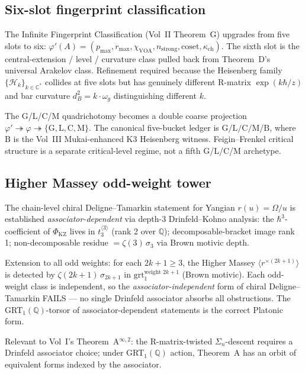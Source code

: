 \documentclass[11pt]{article}
\begin{document}
\subsection{Six-slot fingerprint classification}

The Infinite Fingerprint Classification (Vol~II Theorem~G) upgrades
from five slots to six: $\varphi'(A) = (p_{\max}, r_{\max},
\chi_{\mathrm{VOA}}, n_{\mathrm{strong}}, \mathrm{coset},
\kappa_{\mathrm{ch}})$. The sixth slot is the central-extension /
level / curvature class pulled back from Theorem~D's universal
Arakelov class. Refinement required because the Heisenberg family
$\{\mathcal{H}_k\}_{k \in \mathbb{C}^*}$ collides at five slots but
has genuinely different R-matrix $\exp(k \hbar/z)$ and bar curvature
$d_B^2 = k \cdot \omega_g$ distinguishing different $k$.

The G/L/C/M quadrichotomy becomes a double coarse projection
$\varphi' \twoheadrightarrow \varphi \twoheadrightarrow
\{\mathrm{G}, \mathrm{L}, \mathrm{C}, \mathrm{M}\}$.  The canonical
five-bucket ledger is $\mathrm{G}/\mathrm{L}/\mathrm{C}/\mathrm{M}/
\mathrm{B}$, where $\mathrm{B}$ is the Vol~III Mukai-enhanced K3
Heisenberg witness.  Feigin--Frenkel critical structure is a
separate critical-level regime, not a fifth G/L/C/M archetype.

\subsection{Higher Massey odd-weight tower}

The chain-level chiral Deligne--Tamarkin statement for Yangian
$r(u) = \Omega/u$ is established \emph{associator-dependent} via
depth-3 Drinfeld--Kohno analysis: the $\hbar^3$-coefficient of
$\Phi_{\mathrm{KZ}}$ lives in $t_3^{\langle 3\rangle}$ (rank 2 over
$\mathbb{Q}$); decomposable-bracket image rank 1; non-decomposable
residue $= \zeta(3)\,\sigma_3$ via Brown motivic depth.

Extension to all odd weights: for each $2k+1 \geq 3$, the Higher
Massey $\langle r^{\times(2k+1)}\rangle$ is detected by
$\zeta(2k+1)\,\sigma_{2k+1}$ in $\mathrm{grt}_1^{\text{weight }2k+1}$
(Brown motivic). Each odd-weight class is independent, so the
\emph{associator-independent} form of chiral Deligne--Tamarkin
FAILS --- no single Drinfeld associator absorbs all obstructions.
The GRT$_1(\mathbb{Q})$-torsor of associator-dependent statements is
the correct Platonic form.

Relevant to Vol~I's Theorem~A$^{\infty,2}$: the
R-matrix-twisted $\Sigma_n$-descent requires a Drinfeld associator
choice; under GRT$_1(\mathbb{Q})$ action, Theorem~A has an orbit
of equivalent forms indexed by the associator.
\end{document}
